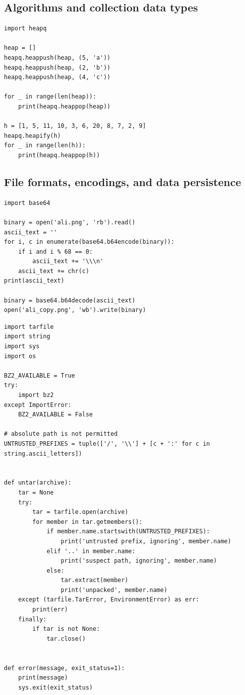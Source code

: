 \subsection{Algorithms and collection data types}

\begin{lstlisting}
import heapq

heap = []
heapq.heappush(heap, (5, 'a'))
heapq.heappush(heap, (2, 'b'))
heapq.heappush(heap, (4, 'c'))

for _ in range(len(heap)):
    print(heapq.heappop(heap))

h = [1, 5, 11, 10, 3, 6, 20, 8, 7, 2, 9]
heapq.heapify(h)
for _ in range(len(h)):
    print(heapq.heappop(h))  
\end{lstlisting}


\subsection{File formats, encodings, and data persistence}

\begin{lstlisting}
import base64

binary = open('ali.png', 'rb').read()
ascii_text = ''
for i, c in enumerate(base64.b64encode(binary)):
    if i and i % 68 == 0:
        ascii_text += '\\\n'
    ascii_text += chr(c)
print(ascii_text)

binary = base64.b64decode(ascii_text)
open('ali_copy.png', 'wb').write(binary)
\end{lstlisting}


\begin{lstlisting}
import tarfile
import string
import sys
import os

BZ2_AVAILABLE = True
try:
    import bz2
except ImportError:
    BZ2_AVAILABLE = False

# absolute path is not permitted
UNTRUSTED_PREFIXES = tuple(['/', '\\'] + [c + ':' for c in string.ascii_letters])


def untar(archive):
    tar = None
    try:
        tar = tarfile.open(archive)
        for member in tar.getmembers():
            if member.name.startswith(UNTRUSTED_PREFIXES):
                print('untrusted prefix, ignoring', member.name)
            elif '..' in member.name:
                print('suspect path, ignoring', member.name)
            else:
                tar.extract(member)
                print('unpacked', member.name)
    except (tarfile.TarError, EnvironmentError) as err:
        print(err)
    finally:
        if tar is not None:
            tar.close()


def error(message, exit_status=1):
    print(message)
    sys.exit(exit_status)  
\end{lstlisting}


